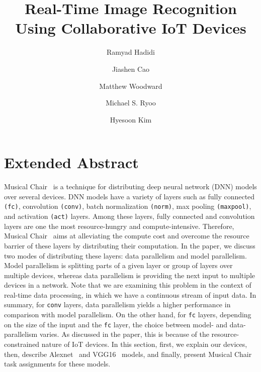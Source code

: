 \documentclass[sigplan]{acmart}
\begin{document}
\title{Real-Time Image Recognition Using Collaborative IoT Devices}

\author{Ramyad Hadidi}

\author{Jiashen Cao}

\author{Matthew Woodward}

\author{Michael S. Ryoo}
\affiliation{\institution{ }}

\author{Hyesoon Kim}

\renewcommand{\shortauthors}{}
\renewcommand{\shorttitle}{}

\begin{abstract}

\end{abstract}

\maketitle

\section{Extended Abstract}

Musical Chair~\cite{musical-chair} is a technique for distributing deep neural network (DNN) models over several devices. DNN models have a variety of layers such as fully connected \texttt{(fc)}, convolution \texttt{(conv)}, batch normalization \texttt{(norm)}, max pooling \texttt{(maxpool)}, and activation \texttt{(act)} layers. Among these layers, fully connected and convolution layers are one the most resource-hungry and compute-intensive. Therefore, Musical Chair~\cite{musical-chair} aims at alleviating the compute cost and overcome the resource barrier of these layers by distributing their computation. In the paper, we discuss two modes of distributing these layers: data parallelism and model parallelism. Model parallelism is splitting parts of a given layer or group of layers over multiple devices, whereas data parallelism is providing the next input to multiple devices in a network. Note that we are examining this problem in the context of real-time data processing, in which we have a continuous stream of input data. In summary, for \texttt{conv} layers, data parallelism yields a higher performance in comparison with model parallelism. On the other hand, for \texttt{fc} layers, depending on the size of the input and the \texttt{fc} layer, the choice between model- and data-parallelism varies. As discussed in the paper, this is because of the resource-constrained nature of IoT devices. In this section, first, we explain our devices, then, describe Alexnet~\cite{kri:sut12} and VGG16~\cite{sim:zis14-deep} models, and finally, present Musical Chair task assignments for these models.
\end{document}
